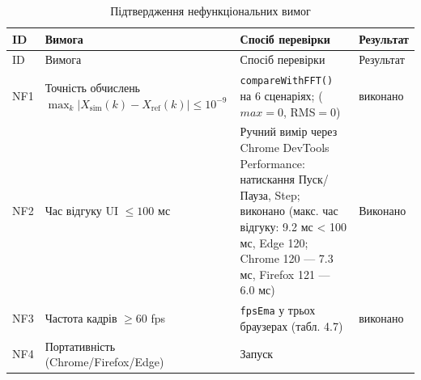 \documentclass[
]{article}
\newcommand{\passthrough}[1]{#1}
\begin{document}
\begin{longtable}[]{@{}
  >{\raggedright\arraybackslash}p{}
  >{\raggedright\arraybackslash}p{}
  >{\raggedright\arraybackslash}p{}
  >{\raggedright\arraybackslash}p{}@{}}
\caption[Підтвердження нефункціональних вимог]{Підтвердження
нефункціональних вимог}\tabularnewline
\toprule\noalign{}
\begin{minipage}[b]{\linewidth}\raggedright
ID
\end{minipage} & \begin{minipage}[b]{\linewidth}\raggedright
Вимога
\end{minipage} & \begin{minipage}[b]{\linewidth}\raggedright
Спосіб перевірки
\end{minipage} & \begin{minipage}[b]{\linewidth}\raggedright
Результат
\end{minipage} \\
\midrule\noalign{}
\endfirsthead
\toprule\noalign{}
\begin{minipage}[b]{\linewidth}\raggedright
ID
\end{minipage} & \begin{minipage}[b]{\linewidth}\raggedright
Вимога
\end{minipage} & \begin{minipage}[b]{\linewidth}\raggedright
Спосіб перевірки
\end{minipage} & \begin{minipage}[b]{\linewidth}\raggedright
Результат
\end{minipage} \\
\midrule\noalign{}
\endhead
\bottomrule\noalign{}
\endlastfoot
NF1 & Точність обчислень
\(\max_{k}|X_{\text{sim}}(k) - X_{\text{ref}}(k)| \leq 10^{- 9}\) &
\passthrough{\lstinline!compareWithFFT!}\passthrough{\lstinline!()!} на
6 сценаріях; (\(max = 0\), RMS\(= 0\)) & виконано \\
NF2 & Час відгуку UI \(\leq 100\) мс & Ручний вимір через Chrome
DevTools Performance: натискання Пуск/Пауза, Step; виконано (макс. час
відгуку: 9.2 мс \textless{} 100 мс, Edge 120; Chrome 120 --- 7.3 мс,
Firefox 121 --- 6.0 мс) & Виконано \\
NF3 & Частота кадрів \(\geq 60\) fps & \passthrough{\lstinline!fpsEma!}
у трьох браузерах (табл. 4.7) & виконано \\
NF4 & Портативність (Chrome/Firefox/Edge) & Запуск

\end{longtable}
\end{document}
